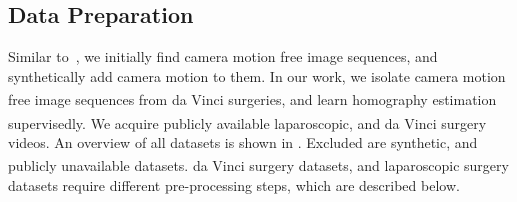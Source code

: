 
\subsection{Data Preparation}

Similar to~\cite{le2020deep}, we initially find camera motion free image sequences, and synthetically add camera motion to them. In our work, we isolate camera motion free image sequences from da Vinci\textsuperscript{\textregistered} surgeries, and learn homography estimation supervisedly. We acquire publicly available laparoscopic, and da Vinci\textsuperscript{\textregistered} surgery videos. An overview of all datasets is shown in . Excluded are synthetic, and publicly unavailable datasets. da Vinci\textsuperscript{\textregistered} surgery datasets, and laparoscopic surgery datasets require different pre-processing steps, which are described below.

